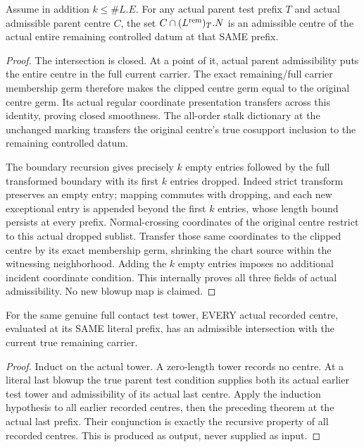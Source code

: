 \begin{theorem}
\label{hir:zero-contact-remainder-clipped-admissible}
\leanok
{}
Assume in addition $k\leq\#L.E$. For any actual parent test prefix $T$ and
actual admissible parent centre $C$, the set
$C\cap (L^{\rm rem})_T.N$ is an admissible centre of the actual entire
remaining controlled datum at that SAME prefix.
\end{theorem}
\begin{proof}
The intersection is closed. At a point of it, actual parent admissibility
puts the entire centre in the full current carrier. The exact remaining/full
carrier membership germ therefore makes the clipped centre germ equal to
the original centre germ. Its actual regular coordinate presentation
transfers across this identity, proving closed smoothness. The all-order
stalk dictionary at the unchanged marking transfers the original
centre's true cosupport inclusion to the remaining controlled datum.

The boundary recursion gives precisely $k$ empty entries followed by the
full transformed boundary with its first $k$ entries dropped. Indeed strict
transform preserves an empty entry; mapping commutes with dropping, and each
new exceptional entry is appended beyond the first $k$ entries, whose length
bound persists at every prefix. Normal-crossing coordinates of the original
centre restrict to this actual dropped sublist. Transfer those same
coordinates to the clipped centre by its exact membership germ, shrinking
the chart source within the witnessing neighborhood. Adding the $k$ empty
entries imposes no additional incident coordinate condition. This internally
proves all three fields of actual admissibility. No new blowup map is claimed.
\end{proof}

\begin{theorem}
\label{hir:zero-contact-remainder-all-literal-clipped-centres}
\leanok
{}
For the same genuine full contact test tower, EVERY actual recorded centre,
evaluated at its SAME literal prefix, has an admissible intersection with
the current true remaining carrier.
\end{theorem}
\begin{proof}
Induct on the actual tower. A zero-length tower records no centre. At a literal
last blowup the true parent test condition supplies both its actual earlier
test tower and admissibility of its actual last centre. Apply the induction
hypothesis to all earlier recorded centres, then the preceding theorem at
the actual last prefix. Their conjunction is exactly the recursive property
of all recorded centres. This is produced as output, never supplied as input.
\end{proof}

